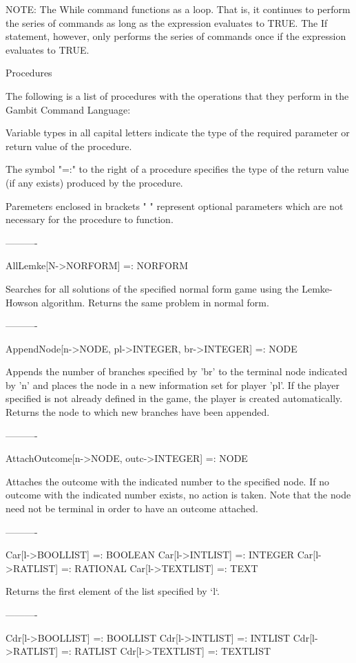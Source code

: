 	NOTE:	The While command functions as a loop.  That is, it continues
		to perform the series of commands as long as the expression
		evaluates to TRUE.  The If statement, however, only performs
		the series of commands once if the expression evaluates to
		TRUE.


Procedures

The following is a list of procedures with the operations that they perform
in the Gambit Command Language:

Variable types in all capital letters indicate the type of the required
parameter or return value of the procedure.

The symbol "=:" to the right of a procedure specifies the type of the return
value (if any exists) produced by the procedure.

Paremeters enclosed in brackets "{ }" represent optional parameters which
are not necessary for the procedure to function.

----------

AllLemke[N->NORFORM] =: NORFORM

	Searches for all solutions of the specified normal form game using the
Lemke-Howson algorithm.  Returns the same problem in normal form.

----------

AppendNode[n->NODE, pl->INTEGER, br->INTEGER] =: NODE

	Appends the number of branches specified by 'br' to the terminal node 
indicated by 'n' and places the node in a new information set for player 'pl'.
If the player specified is not already defined in the game, the player is 
created automatically.  Returns the node to which new branches have been
appended.

----------

AttachOutcome[n->NODE, outc->INTEGER] =: NODE

	Attaches the outcome with the indicated number to the specified node.
If no outcome with the indicated number exists, no action is taken.  Note that
the node need not be terminal in order to have an outcome attached.

----------

Car[l->BOOLLIST] =: BOOLEAN
Car[l->INTLIST] =: INTEGER
Car[l->RATLIST] =: RATIONAL
Car[l->TEXTLIST] =: TEXT

	Returns the first element of the list specified by `l`.

----------

Cdr[l->BOOLLIST] =: BOOLLIST
Cdr[l->INTLIST] =: INTLIST
Cdr[l->RATLIST] =: RATLIST
Cdr[l->TEXTLIST] =: TEXTLIST

